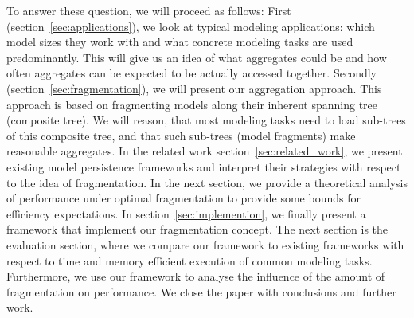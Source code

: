 To answer these question, we will proceed as follows: First (section~\ref{sec:applications}), we look at typical modeling applications: which model sizes they work with and what concrete modeling tasks are used predominantly. This will give us an idea of what aggregates could be and how often aggregates can be expected to be actually accessed together. 
Secondly (section~\ref{sec:fragmentation}), we will present our aggregation approach. This approach is based on fragmenting models along their inherent spanning tree (composite tree). We will reason, that most modeling tasks need to load sub-trees of this composite tree, and that such sub-trees (model fragments) make reasonable aggregates. 
In the related work section~\ref{sec:related_work}, we present existing model persistence frameworks and interpret their strategies with respect to the idea of fragmentation.
In the next section, we provide a theoretical analysis of performance under optimal fragmentation to provide some bounds for efficiency expectations.
In section~\ref{sec:implemention}, we finally present a framework that implement our fragmentation concept.
The next section is the evaluation section, where we compare our framework to existing frameworks with respect to time and memory efficient execution of common modeling tasks. Furthermore, we use our framework to analyse the influence of the amount of fragmentation on performance.
We close the paper with conclusions and further work. 

